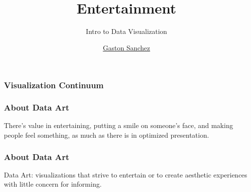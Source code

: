 \documentclass[12pt]{beamer}\usepackage[]{graphicx}\usepackage[]{color}
\title{Entertainment}
\subtitle{Intro to Data Visualization}
\author{\href{http://www.gastonsanchez.com}{Gaston Sanchez}}
\institute{\href{https://creativecommons.org/licenses/by-sa/4.0/}{\tt \scriptsize \color{foreground} CC BY-SA 4.0}}
\date{}
\begin{document}
{
  \frame{\titlepage} 
}


\begin{frame}
\begin{center}
\Huge{}
\end{center}
\end{frame}


\begin{frame}[fragile]
\frametitle{Visualization Continuum}
\begin{center}
\end{center}
\end{frame}


\begin{frame}
\frametitle{About Data Art}

There's value in entertaining, putting a smile on someone's face, and making 
people feel something, as much as there is in optimized presentation.
\eb

\end{frame}


\begin{frame}
\frametitle{About Data Art}

Data Art: visualizations that strive to entertain or to create aesthetic 
experiences with little concern for informing.
\eb

\end{frame}


\begin{frame}
\begin{center}
\Huge{}
\end{center}
\end{frame}

\end{document}
